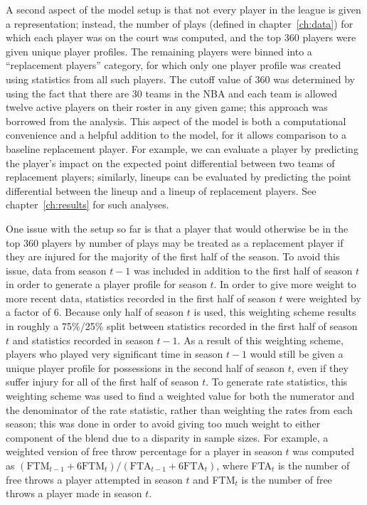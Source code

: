 A second aspect of the model setup is that not every player in the league is given a
representation; instead, the number of plays (defined in chapter~\ref{ch:data}) for
which each player was on the court was computed, and the top 360 players were given
unique player profiles. The remaining players were binned into a ``replacement
players'' category, for which only one player profile was created using statistics
from all such players. The cutoff value of 360 was determined by using the fact that
there are 30 teams in the NBA and each team is allowed twelve active players on
their roster in any given game; this approach was borrowed from the
\citeauthor{Maymin} analysis. This aspect of the model is both a computational
convenience and a helpful addition to the model, for it allows comparison to a
baseline replacement player. For example, we can evaluate a player by predicting the
player's impact on the expected point differential between two teams of replacement
players; similarly, lineups can be evaluated by predicting the point differential
between the lineup and a lineup of replacement players. See chapter~\ref{ch:results}
for such analyses.

One issue with the setup so far is that a player that would otherwise be in the top
360 players by number of plays may be treated as a replacement player if they are
injured for the majority of the first half of the season. To avoid this issue, data
from season $t-1$ was included in addition to the first half of season $t$ in order
to generate a player profile for season $t$. In order to give more weight to more
recent data, statistics recorded in the first half of season $t$ were weighted by a
factor of 6. Because only half of season $t$ is used, this weighting scheme results
in roughly a 75\%/25\% split between statistics recorded in the first half of season
$t$ and statistics recorded in season $t-1$. As a result of this weighting scheme,
players who played very significant time in season $t-1$ would still be given a
unique player profile for possessions in the second half of season $t$, even if they
suffer injury for all of the first half of season $t$. To generate rate statistics,
this weighting scheme was used to find a weighted value for both the numerator and
the denominator of the rate statistic, rather than weighting the rates from each
season; this was done in order to avoid giving too much weight to either component
of the blend due to a disparity in sample sizes. For example, a weighted version of
free throw percentage for a player in season $t$ was computed as $(\text{FTM}_{t-1}
+ 6\text{FTM}_t)/(\text{FTA}_{t-1} + 6\text{FTA}_t)$, where FTA$_t$ is the number of
free throws a player attempted in season $t$ and FTM$_t$ is the number of free
throws a player made in season $t$.

